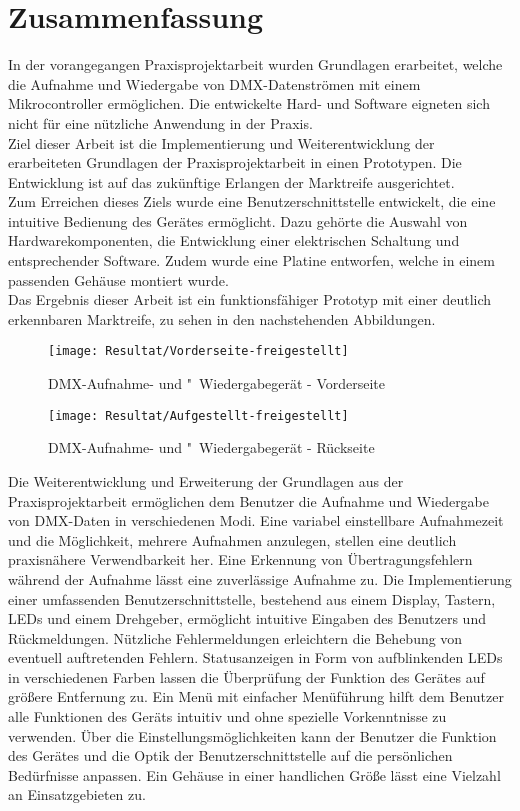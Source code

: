 \newpage
\section{Zusammenfassung}
In der vorangegangen Praxisprojektarbeit wurden Grundlagen erarbeitet, welche die Aufnahme und Wiedergabe von DMX-Datenströmen mit einem Mikrocontroller ermöglichen. Die entwickelte Hard- und Software eigneten sich nicht für eine nützliche Anwendung in der Praxis.\\
Ziel dieser Arbeit ist die Implementierung und Weiterentwicklung der erarbeiteten Grundlagen der Praxisprojektarbeit in einen Prototypen. Die Entwicklung ist auf das zukünftige Erlangen der Marktreife ausgerichtet.\\
Zum Erreichen dieses Ziels wurde eine Benutzerschnittstelle entwickelt, die eine intuitive Bedienung des Gerätes ermöglicht. Dazu gehörte die Auswahl von Hardwarekomponenten, die Entwicklung einer elektrischen Schaltung und entsprechender Software. Zudem wurde eine Platine entworfen, welche in einem passenden Gehäuse montiert wurde.\\
Das Ergebnis dieser Arbeit ist ein funktionsfähiger Prototyp mit einer deutlich erkennbaren Marktreife, zu sehen in den nachstehenden Abbildungen.
\begin{figure}[h]
	\begin{minipage}{.45\linewidth}
		\centering
		\texttt{[image: Resultat/Vorderseite-freigestellt]}
		\caption{DMX-Aufnahme- und "~Wiedergabegerät - Vorderseite}
	\end{minipage}
	\hfill
	\begin{minipage}{.45\linewidth}
		\centering
		\texttt{[image: Resultat/Aufgestellt-freigestellt]}
		\caption{DMX-Aufnahme- und "~Wiedergabegerät - Rückseite}
	\end{minipage}
\end{figure}
Die Weiterentwicklung und Erweiterung der Grundlagen aus der Praxisprojektarbeit ermöglichen dem Benutzer die Aufnahme und Wiedergabe von DMX-Daten in verschiedenen Modi. Eine variabel einstellbare Aufnahmezeit und die Möglichkeit, mehrere Aufnahmen anzulegen, stellen eine deutlich praxisnähere Verwendbarkeit her. Eine Erkennung von Übertragungsfehlern während der Aufnahme lässt eine zuverlässige Aufnahme zu. Die Implementierung einer umfassenden Benutzerschnittstelle, bestehend aus einem Display, Tastern, LEDs und einem Drehgeber, ermöglicht intuitive Eingaben des Benutzers und Rückmeldungen. Nützliche Fehlermeldungen erleichtern die Behebung von eventuell auftretenden Fehlern. Statusanzeigen in Form von aufblinkenden LEDs in verschiedenen Farben lassen die Überprüfung der Funktion des Gerätes auf größere Entfernung zu. Ein Menü mit einfacher Menüführung hilft dem Benutzer alle Funktionen des Geräts intuitiv und ohne spezielle Vorkenntnisse zu verwenden. Über die Einstellungsmöglichkeiten kann der Benutzer die Funktion des Gerätes und die Optik der Benutzerschnittstelle auf die persönlichen Bedürfnisse anpassen. Ein Gehäuse in einer handlichen Größe lässt eine Vielzahl an Einsatzgebieten zu.\\
